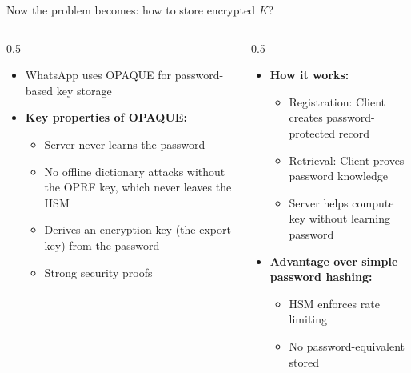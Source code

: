 \ifdefined\PRESENTATION\else\PassOptionsToClass{handout}{beamer}\fi\documentclass[aspectratio=169, lualatex]{beamer}
\begin{document}
\begin{frame}{Now the problem becomes: how to store encrypted $K$?}
	\begin{columns}[c]
		\begin{column}{0.5\textwidth}
			\begin{itemize}
				\item WhatsApp uses OPAQUE for password-based key storage
				\item \textbf{Key properties of OPAQUE:}
				      \begin{itemize}
					      \item Server never learns the password
					      \item No offline dictionary attacks without the OPRF key, which never leaves the HSM
					      \item Derives an encryption key (the export key) from the password
					      \item Strong security proofs
				      \end{itemize}
			\end{itemize}
		\end{column}
		\begin{column}{0.5\textwidth}
			\begin{itemize}
				\item \textbf{How it works:}
				      \begin{itemize}
					      \item Registration: Client creates password-protected record
					      \item Retrieval: Client proves password knowledge
					      \item Server helps compute key without learning password
				      \end{itemize}
				\item \textbf{Advantage over simple password hashing:}
				      \begin{itemize}
					      \item HSM enforces rate limiting
					      \item No password-equivalent stored
				      \end{itemize}
			\end{itemize}
		\end{column}
	\end{columns}
\end{frame}
\end{document}
